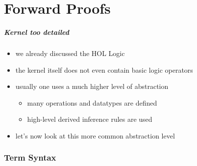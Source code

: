 \part{Forward Proofs}

\frame[plain]{\partpage}

\begin{frame}
\frametitle{Kernel too detailed}
\begin{itemize}
\item we already discussed the HOL Logic
\item the kernel itself does not even contain basic logic operators
\item usually one uses a much higher level of abstraction
\begin{itemize}
\item many operations and datatypes are defined
\item high-level derived inference rules are used
\end{itemize}
\item let's now look at this more common abstraction level
\end{itemize}
\end{frame}


\section{Term Syntax}

